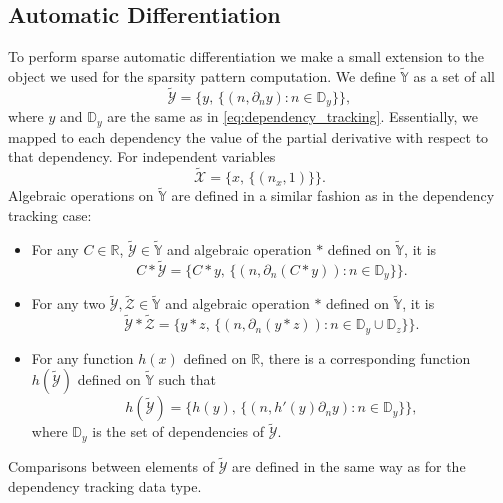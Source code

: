 \documentclass[10pt]{ijnam}
\theoremstyle{definition}
\begin{document}
\subsection{Automatic Differentiation}

To perform sparse automatic differentiation we make a small extension to the object we used for the sparsity pattern computation. We define 
$\tilde{\mathbb{Y}}$ as a set of all 
\begin{equation}
    \tilde{\mathcal{Y}} = \{y, \, \{(n, \partial_n y) : n \in \mathbb{D}_y\}\},
    \label{eq:ad}
\end{equation}
where $y$ and $\mathbb{D}_y$ are the same as in \eqref{eq:dependency_tracking}.
Essentially, we mapped to each dependency the value of the partial derivative with
respect to that dependency. For independent variables 
\begin{equation}
    \tilde{\mathcal{X}} = \{x, \, \{(n_x, 1)\} \}.
\end{equation}
Algebraic operations on $\tilde{\mathbb{Y}}$ are defined in a similar 
fashion as in the dependency tracking case:
\begin{itemize}[leftmargin=1em]
\item For any $C \in \mathbb{R}$, $\tilde{\mathcal{Y}} \in \tilde{\mathbb{Y}}$ 
and algebraic operation $*$ defined on $\tilde{\mathbb{Y}}$, it is
\begin{equation} \label{eq:const_times_var}
    C * \tilde{\mathcal{Y}} = \{ C * y, \, \{(n, \partial_n (C * y)) : n \in \mathbb{D}_y\}\}.
\end{equation}
\item For any two $\tilde{\mathcal{Y}}, \tilde{\mathcal{Z}} \in \tilde{\mathbb{Y}}$ 
and algebraic operation $*$ defined on $\tilde{\mathbb{Y}}$, it is
\begin{equation} \label{eq:var_times_var}
    \tilde{\mathcal{Y}} * \tilde{\mathcal{Z}}
     = \{ y*z, \, \{(n, \partial_n (y * z)) : n \in \mathbb{D}_y \cup \mathbb{D}_z \} \}.
\end{equation}
\item For any function $h(x)$ defined on $\mathbb{R}$, there is a corresponding function 
$h(\tilde{\mathcal{Y}})$ defined on $\tilde{\mathbb{Y}}$ such that
\begin{equation}
    h(\tilde{\mathcal{Y}}) = \{ h(y), \, \{ (n, h'(y) \partial_n y) : n \in \mathbb{D}_y \}\},
\end{equation}
where $\mathbb{D}_y$ is the set of dependencies of $\tilde{\mathcal{Y}}$.
\end{itemize}
Comparisons between elements of $\tilde{\mathcal{Y}}$ are defined in the same way as 
for the dependency tracking data type. 
\end{document}
